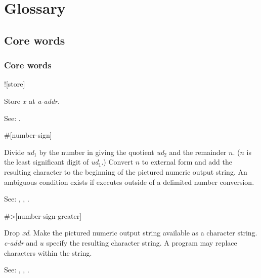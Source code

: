 \chapter{Glossary} %

\section{Core words} %

\begin{info}
\subsection{Core words}
\end{info}

\begin{newword}{10}{!}[store]

	Store $x$ at \emph{a-addr}.

\item[See:]
	.
\end{newword}


\begin{newword}[num]{30}{\#}[number-sign]

	Divide \emph{ud}$_1$ by the number in  giving the
	quotient \emph{ud}$_2$ and the remainder $n$. ($n$ is the least
	significant digit of \emph{ud}$_1$.) Convert $n$ to external
	form and add the resulting character to the beginning of the
	pictured numeric output string. An ambiguous condition exists
	if  executes outside of a  
	delimited number conversion.

\item[See:]
	,
	,
	.
\end{newword}


\begin{newword}{40}{\#>}[number-sign-greater]

	Drop \emph{xd}. Make the pictured numeric output string
	available as a character string. \emph{c-addr} and $u$
	specify the resulting character string. A program may replace
	characters within the string.

\item[See:]
	,
	,
	.
\end{newword}


